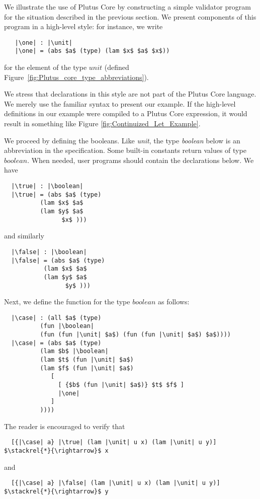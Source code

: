 \documentclass[../plutus-core-specification.tex]{subfiles}
\begin{document}
We illustrate the use of Plutus Core by constructing a simple
validator program for the situation described in the previous
section. We present components of this program in a high-level style:
for instance, we write
\begin{lstlisting}
   |\one| : |\unit|
   |\one| = (abs $a$ (type) (lam $x$ $a$ $x$))
\end{lstlisting}
for the element of the type $unit$ (defined Figure~\ref{fig:Plutus_core_type_abbreviations}).

We stress that declarations in this style are not part of the Plutus
Core language. We merely use the familiar syntax to present our
example. If the high-level definitions in our example were compiled to
a Plutus Core expression, it would result in something like Figure
\ref{fig:Continuized_Let_Example}.

We proceed by defining the booleans. Like \textit{unit}, the type \textit{boolean}
below is an abbreviation in the specification. Some built-in constants
return values of type $boolean$. When needed, user programs should
contain the declarations below. We have


\begin{lstlisting}
  |\true| : |\boolean|
  |\true| = (abs $a$ (type)
          (lam $x$ $a$
          (lam $y$ $a$
                $x$ )))
\end{lstlisting}
and similarly
\begin{lstlisting}
  |\false| : |\boolean|
  |\false| = (abs $a$ (type)
           (lam $x$ $a$
           (lam $y$ $a$
                 $y$ )))
\end{lstlisting}

\noindent Next, we define the \case{} function for the type $boolean$ as follows:
\begin{lstlisting}
  |\case| : (all $a$ (type)
          (fun |\boolean|
          (fun (fun |\unit| $a$) (fun (fun |\unit| $a$) $a$))))
  |\case| = (abs $a$ (type)
          (lam $b$ |\boolean|
          (lam $t$ (fun |\unit| $a$)
          (lam $f$ (fun |\unit| $a$)
             [
               [ {$b$ (fun |\unit| $a$)} $t$ $f$ ]
               |\one|
             ]
          ))))
\end{lstlisting}
The reader is encouraged to verify that
\begin{lstlisting}
  [{|\case| a} |\true| (lam |\unit| u x) (lam |\unit| u y)] $\stackrel{*}{\rightarrow}$ x
\end{lstlisting}
and
\begin{lstlisting}
  [{|\case| a} |\false| (lam |\unit| u x) (lam |\unit| u y)] $\stackrel{*}{\rightarrow}$ y
\end{lstlisting}
\end{document}
